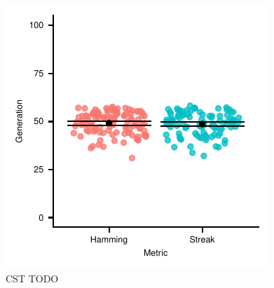 \begin{figure}[]{\linewidth}
\centering
\includegraphics[width=\linewidth]{img/gp_results/panel-cst-times.pdf}%
\caption{
 CST TODO
 }
\label{fig:cst-times}
\end{figure}
